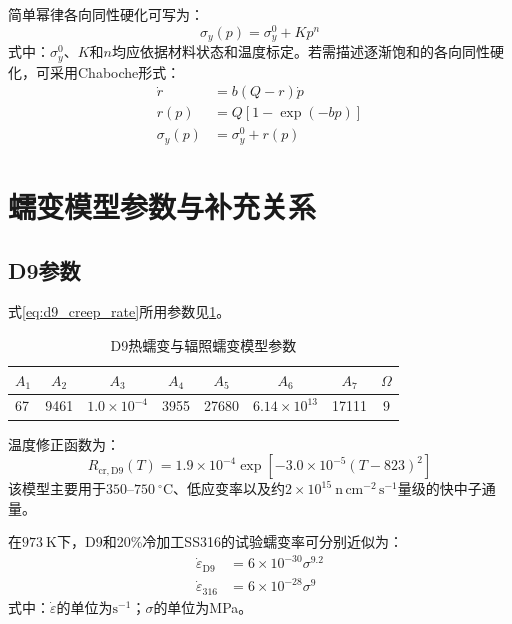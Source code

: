 简单幂律各向同性硬化可写为：
\begin{equation}
	\sigma_y(p)=\sigma_y^0+Kp^n
	\label{eq:appendix_ss316_power_hardening}
\end{equation}
\noindent 式中：$\sigma_y^0$、$K$和$n$均应依据材料状态和温度标定。若需描述逐渐饱和的各向同性硬化，可采用Chaboche形式：
\begin{equation}
	\label{eq:appendix_ss316_chaboche_isotropic_hardening}
	\begin{aligned}
		\dot r&=b(Q-r)\dot p\\
		r(p)&=Q[1-\exp(-bp)]\\
		\sigma_y(p)&=\sigma_y^0+r(p)
	\end{aligned}
\end{equation}


\section{蠕变模型参数与补充关系}
\label{app:cladding_creep_parameters}

\subsection{D9参数}

式\eqref{eq:d9_creep_rate}所用参数见\tablename\ref{tab:appendix_d9_creep_parameters}\cite{hofmanMetallicFuelsHandbook2019}。
\begin{table}[htbp]
	\centering
	\caption{D9热蠕变与辐照蠕变模型参数}
	\label{tab:appendix_d9_creep_parameters}
	\begin{tabular*}{\textwidth}{
			@{\extracolsep{\fill}}
			lccccccc
			@{}
		}
		\toprule
		$A_1$ & $A_2$ & $A_3$ & $A_4$ & $A_5$ & $A_6$ & $A_7$ & $\Omega$ \\
		\midrule
		67 & 9461 & $1.0\times10^{-4}$ & 3955 & 27680 & $6.14\times10^{13}$ & 17111 & 9 \\
		\bottomrule
	\end{tabular*}
\end{table}
温度修正函数为：
\begin{equation}
	R_{\mathrm{cr,D9}}(T)
	=1.9\times10^{-4}
	\exp[-3.0\times10^{-5}(T-823)^2]
	\label{eq:appendix_d9_creep_temperature_factor}
\end{equation}
该模型主要用于$350$--$750\ ^\circ\mathrm C$、低应变率以及约$2\times10^{15}\ \mathrm{n\,cm^{-2}\,s^{-1}}$量级的快中子通量。

在$973\ \mathrm{K}$下，D9和20\%冷加工SS316的试验蠕变率可分别近似为\cite{lathaThermalCreepProperties2008}：
\begin{equation}
	\label{eq:appendix_d9_ss316_973k_creep}
	\begin{aligned}
		\dot\varepsilon_{\mathrm{D9}}
		&=6\times10^{-30}\sigma^{9.2}\\
		\dot\varepsilon_{316}
		&=6\times10^{-28}\sigma^9
	\end{aligned}
\end{equation}
\noindent 式中：$\dot\varepsilon$的单位为$\mathrm{s^{-1}}$；$\sigma$的单位为MPa。

